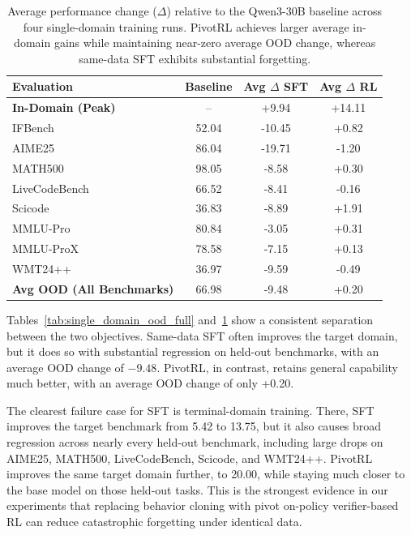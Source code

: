 \begin{table}[t]
\centering
\small
\begin{tabular}{l c cc}
\toprule
\textbf{Evaluation} & \textbf{Baseline} & \textbf{Avg $\Delta$ SFT} & \textbf{Avg $\Delta$ RL} \\
\midrule
\textbf{In-Domain (Peak)} & -- & +9.94 & +14.11 \\
\midrule
IFBench        & 52.04 & -10.45 & +0.82 \\
AIME25         & 86.04 & -19.71 & -1.20 \\
MATH500        & 98.05 & -8.58  & +0.30 \\
LiveCodeBench  & 66.52 & -8.41  & -0.16 \\
Scicode        & 36.83 & -8.89  & +1.91 \\
MMLU-Pro       & 80.84 & -3.05  & +0.31 \\
MMLU-ProX      & 78.58 & -7.15  & +0.13 \\
WMT24++        & 36.97 & -9.59  & -0.49 \\
\midrule
\textbf{Avg OOD (All Benchmarks)} & 66.98 & -9.48 & +0.20 \\
\bottomrule
\end{tabular}
\caption{
Average performance change ($\Delta$) relative to the Qwen3-30B baseline across four single-domain training runs.
PivotRL achieves larger average in-domain gains while maintaining near-zero average OOD change, whereas same-data SFT exhibits substantial forgetting.
}
\label{tab:single_domain_ood_avg}
\end{table}

Tables~\ref{tab:single_domain_ood_full} and~\ref{tab:single_domain_ood_avg} show a consistent separation between the two objectives. Same-data SFT often improves the target domain, but it does so with substantial regression on held-out benchmarks, with an average OOD change of $-9.48$. PivotRL, in contrast, retains general capability much better, with an average OOD change of only +0.20.

The clearest failure case for SFT is terminal-domain training. There, SFT improves the target benchmark from 5.42 to 13.75, but it also causes broad regression across nearly every held-out benchmark, including large drops on AIME25, MATH500, LiveCodeBench, Scicode, and WMT24++. PivotRL improves the same target domain further, to 20.00, while staying much closer to the base model on those held-out tasks. This is the strongest evidence in our experiments that replacing behavior cloning with pivot on-policy verifier-based RL can reduce catastrophic forgetting under identical data.

